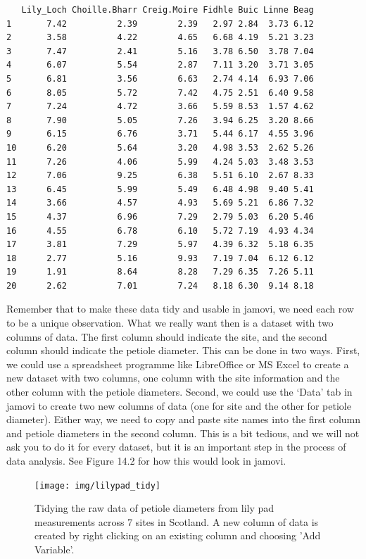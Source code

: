 \documentclass[
]{scrbook}
\begin{document}
\begin{verbatim}
   Lily_Loch Choille.Bharr Creig.Moire Fidhle Buic Linne Beag
1       7.42          2.39        2.39   2.97 2.84  3.73 6.12
2       3.58          4.22        4.65   6.68 4.19  5.21 3.23
3       7.47          2.41        5.16   3.78 6.50  3.78 7.04
4       6.07          5.54        2.87   7.11 3.20  3.71 3.05
5       6.81          3.56        6.63   2.74 4.14  6.93 7.06
6       8.05          5.72        7.42   4.75 2.51  6.40 9.58
7       7.24          4.72        3.66   5.59 8.53  1.57 4.62
8       7.90          5.05        7.26   3.94 6.25  3.20 8.66
9       6.15          6.76        3.71   5.44 6.17  4.55 3.96
10      6.20          5.64        3.20   4.98 3.53  2.62 5.26
11      7.26          4.06        5.99   4.24 5.03  3.48 3.53
12      7.06          9.25        6.38   5.51 6.10  2.67 8.33
13      6.45          5.99        5.49   6.48 4.98  9.40 5.41
14      3.66          4.57        4.93   5.69 5.21  6.86 7.32
15      4.37          6.96        7.29   2.79 5.03  6.20 5.46
16      4.55          6.78        6.10   5.72 7.19  4.93 4.34
17      3.81          7.29        5.97   4.39 6.32  5.18 6.35
18      2.77          5.16        9.93   7.19 7.04  6.12 6.12
19      1.91          8.64        8.28   7.29 6.35  7.26 5.11
20      2.62          7.01        7.24   8.18 6.30  9.14 8.18
\end{verbatim}

Remember that to make these data tidy and usable in jamovi, we need each row to be a unique observation.
What we really want then is a dataset with two columns of data.
The first column should indicate the site, and the second column should indicate the petiole diameter.
This can be done in two ways.
First, we could use a spreadsheet programme like LibreOffice or MS Excel to create a new dataset with two columns, one column with the site information and the other column with the petiole diameters.
Second, we could use the `Data' tab in jamovi to create two new columns of data (one for site and the other for petiole diameter).
Either way, we need to copy and paste site names into the first column and petiole diameters in the second column.
This is a bit tedious, and we will not ask you to do it for every dataset, but it is an important step in the process of data analysis.
See Figure 14.2 for how this would look in jamovi.

\begin{figure}
\texttt{[image: img/lilypad\_tidy]} \caption{Tidying the raw data of petiole diameters from lily pad measurements across 7 sites in Scotland. A new column of data is created by right clicking on an existing column and choosing 'Add Variable'.}\label{fig:unnamed-chunk-50}
\end{figure}
\end{document}
